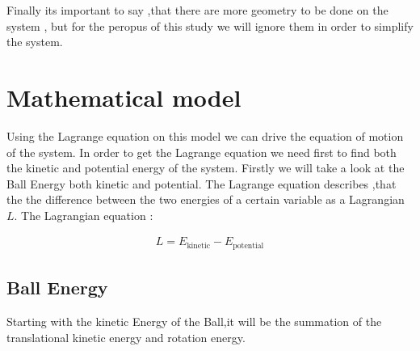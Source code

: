\documentclass{article}
\begin{document}
\noindent Finally its important to say ,that there are more geometry to be done on the system , but for the peropus of this study we will ignore them in order to simplify the system.

\newpage
\section{Mathematical model}
\noindent Using the Lagrange equation on this model we can drive the equation of motion of the system.
In order to get the Lagrange equation we need first to find both the kinetic and potential energy of the system.
Firstly we will take a look at the Ball Energy both kinetic and potential.
The Lagrange equation describes ,that the the difference between the two energies of a certain variable as a Lagrangian $L$.
The Lagrangian equation :

\begin{equation}\label{Lagrangian}
	\begin{split}
		L = E_{\text{kinetic}} - E_{\text{potential}}
	\end{split}
\end{equation}
\subsection{Ball Energy}

Starting with the kinetic Energy of the Ball,it will be the summation of the translational kinetic energy and rotation energy.
\end{document}
